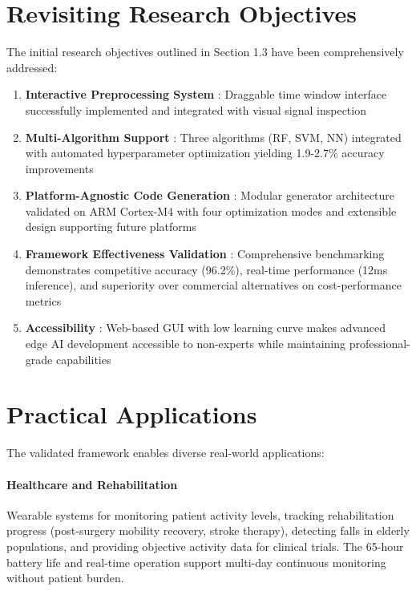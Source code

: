 \section{Revisiting Research Objectives}

The initial research objectives outlined in Section 1.3 have been comprehensively addressed:

\begin{enumerate}
    \item \textbf{Interactive Preprocessing System} \checkmark: Draggable time window interface successfully implemented and integrated with visual signal inspection
    
    \item \textbf{Multi-Algorithm Support} \checkmark: Three algorithms (RF, SVM, NN) integrated with automated hyperparameter optimization yielding 1.9-2.7\% accuracy improvements
    
    \item \textbf{Platform-Agnostic Code Generation} \checkmark: Modular generator architecture validated on ARM Cortex-M4 with four optimization modes and extensible design supporting future platforms
    
    \item \textbf{Framework Effectiveness Validation} \checkmark: Comprehensive benchmarking demonstrates competitive accuracy (96.2\%), real-time performance (12ms inference), and superiority over commercial alternatives on cost-performance metrics
    
    \item \textbf{Accessibility} \checkmark: Web-based GUI with low learning curve makes advanced edge AI development accessible to non-experts while maintaining professional-grade capabilities
\end{enumerate}

\section{Practical Applications}

The validated framework enables diverse real-world applications:

\paragraph{Healthcare and Rehabilitation}
Wearable systems for monitoring patient activity levels, tracking rehabilitation progress (post-surgery mobility recovery, stroke therapy), detecting falls in elderly populations, and providing objective activity data for clinical trials. The 65-hour battery life and real-time operation support multi-day continuous monitoring without patient burden.

